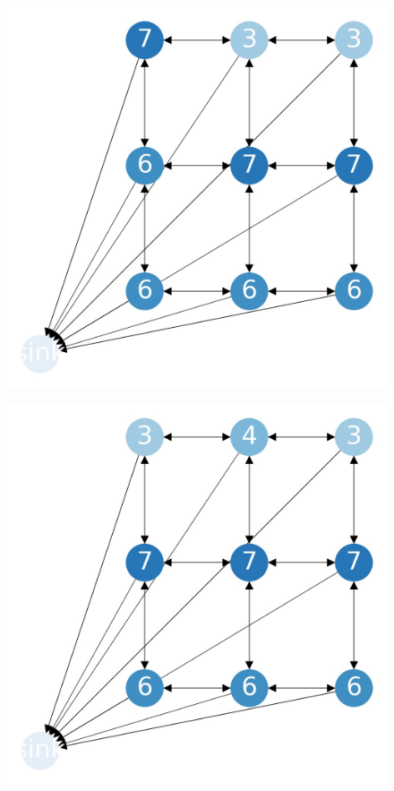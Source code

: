 \documentclass{beamer}
\begin{document}
    \begin{frame}
      \begin{figure}[h!]
        \centering
          \includegraphics[scale=0.25]{sandpile_-2}
      \end{figure}
    \end{frame}
    

    \begin{frame}
      \begin{figure}[h!]
        \centering
          \includegraphics[scale=0.25]{sandpile_-3}
      \end{figure}
    \end{frame}
    
\end{document}
